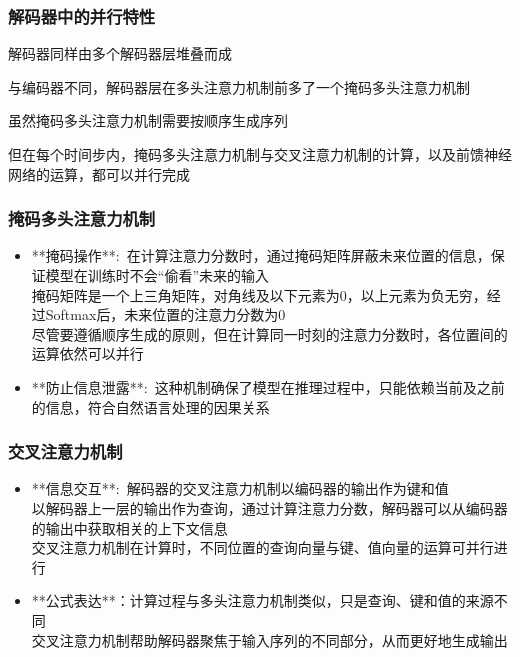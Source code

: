 \begin{frame}
    \frametitle{解码器中的并行特性}
    解码器同样由多个解码器层堆叠而成

    与编码器不同，解码器层在多头注意力机制前多了一个掩码多头注意力机制

    虽然掩码多头注意力机制需要按顺序生成序列

    但在每个时间步内，掩码多头注意力机制与交叉注意力机制的计算，以及前馈神经网络的运算，都可以并行完成
\end{frame}

\begin{frame}
    \frametitle{掩码多头注意力机制}
    \begin{itemize}
        \item **掩码操作**:~在计算注意力分数时，通过掩码矩阵屏蔽未来位置的信息，保证模型在训练时不会“偷看”未来的输入\\
		掩码矩阵是一个上三角矩阵，对角线及以下元素为0，以上元素为负无穷，经过\textrm{Softmax}后，未来位置的注意力分数为0\\
		尽管要遵循顺序生成的原则，但在计算同一时刻的注意力分数时，各位置间的运算依然可以并行
        \item **防止信息泄露**:~这种机制确保了模型在推理过程中，只能依赖当前及之前的信息，符合自然语言处理的因果关系
    \end{itemize}
\end{frame}

\begin{frame}
    \frametitle{交叉注意力机制}
    \begin{itemize}
        \item **信息交互**:~解码器的交叉注意力机制以编码器的输出作为键和值\\
		以解码器上一层的输出作为查询，通过计算注意力分数，解码器可以从编码器的输出中获取相关的上下文信息\\
		交叉注意力机制在计算时，不同位置的查询向量与键、值向量的运算可并行进行
        \item **公式表达**：计算过程与多头注意力机制类似，只是查询、键和值的来源不同\\
		交叉注意力机制帮助解码器聚焦于输入序列的不同部分，从而更好地生成输出
    \end{itemize}
\end{frame}

